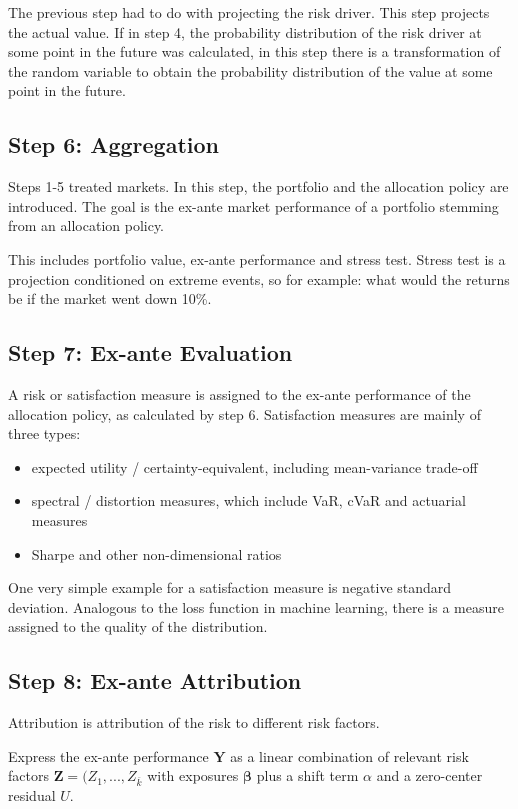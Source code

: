 The previous step had to do with projecting the risk driver. This step projects the actual value. If in step 4, the probability distribution of the risk driver at some point in the future was calculated, in this step there is a transformation of the random variable to obtain the probability distribution of the value at some point in the future. 

\subsection{Step 6: Aggregation}
Steps 1-5 treated markets. In this step, the portfolio and the allocation policy are introduced. The goal is the ex-ante market performance of a portfolio stemming from an allocation policy. 

This includes portfolio value, ex-ante performance and stress test. Stress test is a projection conditioned on extreme events, so for example: what would the returns be if the market went down 10\%.

\subsection{Step 7: Ex-ante Evaluation}
A risk or satisfaction measure is assigned to the ex-ante performance of the allocation policy, as calculated by step 6. Satisfaction measures are mainly of three types:

\begin{itemize}
\item expected utility / certainty-equivalent, including mean-variance trade-off
\item spectral / distortion measures, which include VaR, cVaR and actuarial measures
\item Sharpe and other non-dimensional ratios
\end{itemize}

One very simple example for a satisfaction measure is negative standard deviation. Analogous to the loss function in machine learning, there is a measure assigned to the quality of the distribution.

\subsection{Step 8: Ex-ante Attribution}

Attribution is attribution of the risk to different risk factors.

Express the ex-ante performance $\mathbf{Y}$ as a linear combination of relevant risk factors $\mathbf{Z} = (Z_1,...,Z_{\overline{k}}$ with exposures $\mathbf{\beta}$ plus a shift term $\alpha$ and a zero-center residual $U$. 

